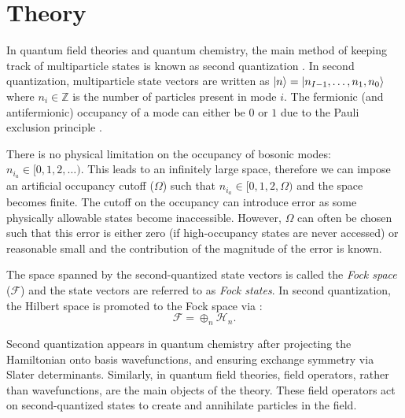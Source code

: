 \section{Theory}
\label{sec:theory}

In quantum field theories and quantum chemistry, the main method of keeping track of multiparticle states is known as second quantization \cite{Sakurai_Napolitano_2020}.
In second quantization, multiparticle state vectors are written as $\ket{n} = \ket{n_{I-1}, \dots, n_1, n_0}$ where $n_i \in \mathbb{Z}$ is the number of particles present in mode $i$.
The fermionic (and antifermionic) occupancy of a mode can either be $0$ or $1$ due to the Pauli exclusion principle \cite{pauli1925zusammenhang}.

There is no physical limitation on the occupancy of bosonic modes: $n_{i_a} \in [0, 1, 2, \dots)$.
This leads to an infinitely large space, therefore we can impose an artificial occupancy cutoff ($\Omega$) such that $n_{i_a} \in [0, 1, 2, \Omega)$ and the space becomes finite.
The cutoff on the occupancy can introduce error as some physically allowable states become inaccessible.
However, $\Omega$ can often be chosen such that this error is either zero (if high-occupancy states are never accessed) or reasonable small and the contribution of the magnitude of the error is known. 

The space spanned by the second-quantized state vectors is called the \textit{Fock space} ($\mathcal{F}$) and the state vectors are referred to as \textit{Fock states}.
In second quantization, the Hilbert space is promoted to the Fock space via \cite{Schwartz_2013}:
\begin{equation}
    \mathcal{F} = \oplus_n \mathcal{H}_n.
\end{equation}

Second quantization appears in quantum chemistry after projecting the Hamiltonian onto basis wavefunctions, and ensuring exchange symmetry via Slater determinants.
Similarly, in quantum field theories, field operators, rather than wavefunctions, are the main objects of the theory. These field operators act on second-quantized states to create and annihilate particles in the field. 

